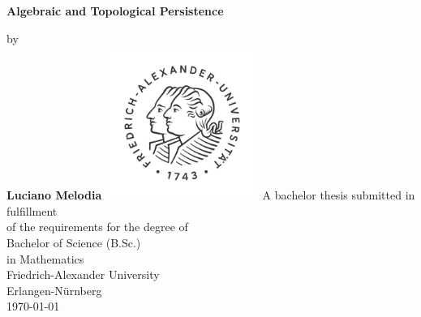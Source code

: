 \begin{titlepage}
    \begin{center}
        \vspace*{1cm}
        \Huge
        \textbf{Algebraic and Topological Persistence}
        \vspace{1cm}
        \Large
        
        by\\
        \textbf{Luciano Melodia}
        \vfill
        \includegraphics[width=5cm]{images/fau.png}
        \vfill
        A bachelor thesis submitted in fulfillment\\
        of the requirements for the degree of\\
        Bachelor of Science (B.Sc.)\\
        in Mathematics\\ 
        \vspace{1.5cm}
        \large
        Friedrich-Alexander University\\
        Erlangen-Nürnberg\\
        \today
    \end{center}
\end{titlepage}
